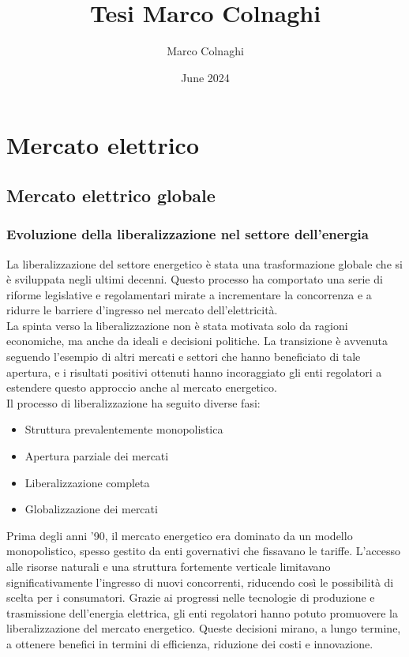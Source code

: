 \documentclass{article}
\title{Tesi Marco Colnaghi}
\author{Marco Colnaghi}
\date{June 2024}
\begin{document}
\maketitle
\newpage

\section{Mercato elettrico}
\subsection{Mercato elettrico globale}
\subsubsection{Evoluzione della liberalizzazione nel settore dell'energia}
La liberalizzazione del settore energetico è stata una trasformazione globale che si è sviluppata negli ultimi decenni. Questo processo ha comportato una serie di riforme legislative e regolamentari mirate a incrementare la concorrenza e a ridurre le barriere d'ingresso nel mercato dell'elettricità.\\
La spinta verso la liberalizzazione non è stata motivata solo da ragioni economiche, ma anche da ideali e decisioni politiche. La transizione è avvenuta seguendo l'esempio di altri mercati e settori che hanno beneficiato di tale apertura, e i risultati positivi ottenuti hanno incoraggiato gli enti regolatori a estendere questo approccio anche al mercato energetico.\cite{Weron2006}\\
Il processo di liberalizzazione ha seguito diverse fasi:
\begin{itemize}
    \item Struttura prevalentemente monopolistica
    \item Apertura parziale dei mercati
    \item Liberalizzazione completa
    \item Globalizzazione dei mercati 
\end{itemize}
Prima degli anni '90, il mercato energetico era dominato da un modello monopolistico, spesso gestito da enti governativi che fissavano le tariffe. L'accesso alle risorse naturali e una struttura fortemente verticale limitavano significativamente l'ingresso di nuovi concorrenti, riducendo così le possibilità di scelta per i consumatori. Grazie ai progressi nelle tecnologie di produzione e trasmissione dell'energia elettrica, gli enti regolatori hanno potuto promuovere la liberalizzazione del mercato energetico. Queste decisioni mirano, a lungo termine, a ottenere benefici in termini di efficienza, riduzione dei costi e innovazione.\\
\end{document}
